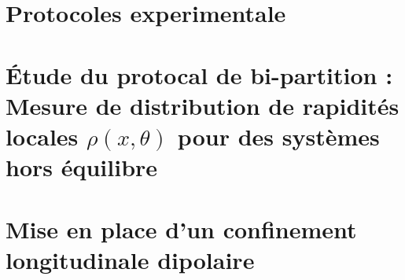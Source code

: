 \chapter{Protocoles experimentale}
\minitoc



\chapter{Étude du protocal de bi-partition : Mesure de distribution de rapidités locales $\rho(x , \theta ) $  pour des systèmes hors équilibre}
\minitoc

%


\chapter{Mise en place d'un confinement longitudinale dipolaire}
\minitoc


%
%	







%
%

%

